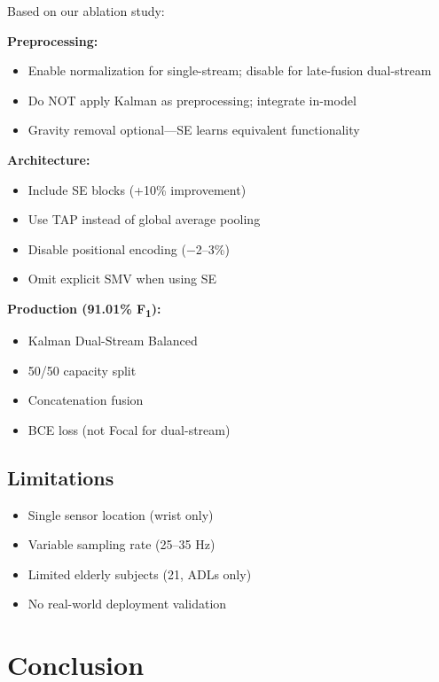 \documentclass[journal,12pt]{IEEEtran}
\newcommand{\fone}{F\textsubscript{1}}
\begin{document}
Based on our ablation study:

\textbf{Preprocessing:}
\begin{itemize}
    \item Enable normalization for single-stream; disable for late-fusion dual-stream
    \item Do NOT apply Kalman as preprocessing; integrate in-model
    \item Gravity removal optional---SE learns equivalent functionality
\end{itemize}

\textbf{Architecture:}
\begin{itemize}
    \item Include SE blocks (+10\% improvement)
    \item Use TAP instead of global average pooling
    \item Disable positional encoding ($-$2--3\%)
    \item Omit explicit SMV when using SE
\end{itemize}

\textbf{Production (91.01\% \fone{}):}
\begin{itemize}
    \item Kalman Dual-Stream Balanced
    \item 50/50 capacity split
    \item Concatenation fusion
    \item BCE loss (not Focal for dual-stream)
\end{itemize}

\subsection{Limitations}

\begin{itemize}
    \item Single sensor location (wrist only)
    \item Variable sampling rate (25--35 Hz)
    \item Limited elderly subjects (21, ADLs only)
    \item No real-world deployment validation
\end{itemize}


\section{Conclusion}
\label{sec:conclusion}
\end{document}
